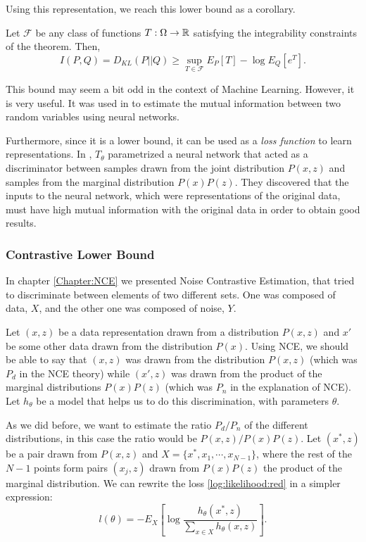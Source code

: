 Using this representation, we reach this lower bound as a corollary. 

\begin{corollary}
    Let $\mathcal F$ be any class of functions $T: \Omega \to \mathbb{R}$ satisfying the integrability constraints of the theorem. Then, 
$$
I(P,Q) = D_{KL}(P||Q) \geq \sup_{T \in \mathcal F} E_P[T] - \log E_Q\left[e^T\right].
$$
\end{corollary}

This bound may seem a bit odd in the context of Machine Learning. However, it is very useful. It was used in \cite{belghazi2018mine} to estimate the mutual information between two random variables using neural networks.

Furthermore, since it is a lower bound, it can be used as a \emph{loss function} to learn representations. In \cite{hjelm_learning_2019}, $T_\theta$ parametrized a neural network that acted as a discriminator between samples drawn from the joint distribution $P(x,z)$ and samples from the marginal distribution $P(x)P(z)$. They discovered that the inputs to the neural network, which were representations of the original data, must have high mutual information with the original data in order to obtain good results.

\subsubsection{Contrastive Lower Bound}

In chapter \ref{Chapter:NCE} we presented Noise Contrastive Estimation, that tried to discriminate between elements of two different sets. One was composed of data, $X$, and the other one was composed of noise, $Y$.

Let $(x,z)$ be a data representation drawn from a distribution $P(x,z)$ and $x'$ be some other data drawn from the distribution $P(x)$. Using NCE, we should be able to say that $(x,z)$ was drawn from the distribution $P(x,z)$ (which was $P_d$ in the NCE theory) while $(x',z)$ was drawn from the product of the marginal distributions $P(x)P(z)$ (which was $P_n$ in the explanation of NCE). Let $h_\theta$ be a model that helps us to do this discrimination, with parameters $\theta$. 

As we did before, we want to estimate the ratio $P_d/P_n$ of the different distributions, in this case the ratio would be $P(x,z)/P(x)P(z)$. Let $(x^*,z)$ be a pair drawn from $P(x,z)$ and $X = \{x^*, x_1,\cdots,x_{N-1} \}$, where the rest of the $N-1$ points form pairs $(x_j,z)$ drawn from $P(x)P(z)$ the product of the marginal distribution. We can rewrite the loss \ref{log:likelihood:red} in a simpler expression:
\begin{equation}\label{log:likelihood:rewritten}
l(\theta) = - E_X \left[ \log \frac{h_\theta(x^*,z)}{\sum_{x \in X}h_\theta(x,z)}\right]  .
\end{equation}

